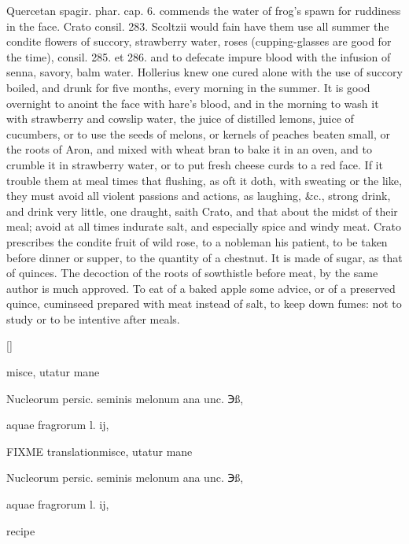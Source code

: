 Quercetan spagir. phar. cap. 6.
commends the water of frog's spawn for ruddiness in the face.
Crato consil. 283. Scoltzii would fain have them use all summer
the condite flowers of succory, strawberry water, roses
(cupping-glasses are good for the time), consil. 285. et 286. and to
defecate impure blood with the infusion of senna, savory, balm water.
Hollerius knew one cured alone with the use of succory boiled,
and drunk for five months, every morning in the summer. It is
good overnight to anoint the face with hare's blood, and in the morning
to wash it with strawberry and cowslip water, the juice of distilled
lemons, juice of cucumbers, or to use the seeds of melons, or kernels
of peaches beaten small, or the roots of Aron, and mixed with wheat
bran to bake it in an oven, and to crumble it in strawberry water,
 or to put fresh cheese curds to a red face.
If it trouble them at meal times that flushing, as oft it doth, with
sweating or the like, they must avoid all violent passions and actions,
as laughing, \&c., strong drink, and drink very little, one
draught, saith Crato, and that about the midst of their meal; avoid at
all times indurate salt, and especially spice and windy meat.
Crato prescribes the condite fruit of wild rose, to a nobleman
his patient, to be taken before dinner or supper, to the quantity of a
chestnut. It is made of sugar, as that of quinces. The decoction of the
roots of sowthistle before meat, by the same author is much approved.
To eat of a baked apple some advice, or of a preserved quince,
cuminseed prepared with meat instead of salt, to keep down fumes: not
to study or to be intentive after meals.

\begin{Prescription}[H]
[\baselineskip]
\begin{prescriptionbox}{}{\textlatin{misce, utatur mane}}
\item \textlatin{Nucleorum persic. seminis melonum ana unc. ℈ß},
\item \textlatin{aquae fragrorum l. ij},
\end{prescriptionbox}
\begin{prescriptionbox}{FIXME translation}{\textlatin{misce, utatur mane}}
\item \textlatin{Nucleorum persic. seminis melonum ana unc. ℈ß},
\item \textlatin{aquae fragrorum l. ij},
\end{prescriptionbox}
\caption{ recipe}
\end{Prescription}

